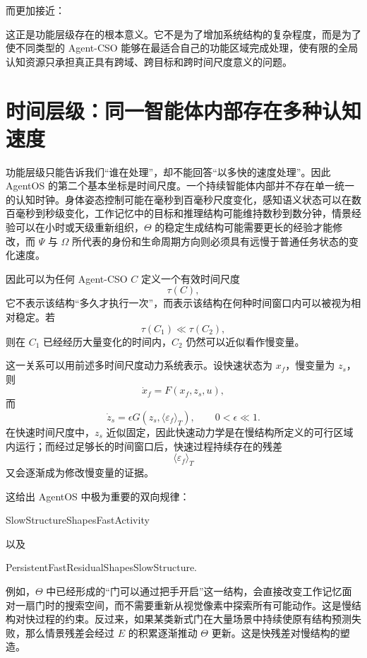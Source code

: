 而更加接近：

\begin{statementbox}
\centering
{}
\end{statementbox}

这正是功能层级存在的根本意义。它不是为了增加系统结构的复杂程度，而是为了使不同类型的 Agent-CSO 能够在最适合自己的功能区域完成处理，使有限的全局认知资源只承担真正具有跨域、跨目标和跨时间尺度意义的问题。


\section{时间层级：同一智能体内部存在多种认知速度}

功能层级只能告诉我们“谁在处理”，却不能回答“以多快的速度处理”。因此 AgentOS 的第二个基本坐标是时间尺度。一个持续智能体内部并不存在单一统一的认知时钟。身体姿态控制可能在毫秒到百毫秒尺度变化，感知语义状态可以在数百毫秒到秒级变化，工作记忆中的目标和推理结构可能维持数秒到数分钟，情景经验可以在小时或天级重新组织，$\Theta$ 的稳定生成结构可能需要更长的经验才能修改，而 $\Psi$ 与 $\Omega$ 所代表的身份和生命周期方向则必须具有远慢于普通任务状态的变化速度。

因此可以为任何 Agent-CSO $C$ 定义一个有效时间尺度
\[
\tau(C),
\]
它不表示该结构“多久才执行一次”，而表示该结构在何种时间窗口内可以被视为相对稳定。若
\[
\tau(C_1)\ll\tau(C_2),
\]
则在 $C_1$ 已经经历大量变化的时间内，$C_2$ 仍然可以近似看作慢变量。

这一关系可以用前述多时间尺度动力系统表示。设快速状态为 $x_f$，慢变量为 $z_s$，则
\[
\dot x_f
=
F(x_f,z_s,u),
\]
而
\[
\dot z_s
=
\epsilon G(z_s,\langle \varepsilon_f\rangle_T),
\qquad
0<\epsilon\ll1.
\]
在快速时间尺度中，$z_s$ 近似固定，因此快速动力学是在慢结构所定义的可行区域内运行；而经过足够长的时间窗口后，快速过程持续存在的残差
\[
\langle\varepsilon_f\rangle_T
\]
又会逐渐成为修改慢变量的证据。

这给出 AgentOS 中极为重要的双向规律：
\begin{statementbox}
SlowStructureShapesFastActivity
\end{statementbox}
以及
\begin{statementbox}
PersistentFastResidualShapesSlowStructure.
\end{statementbox}

例如，$\Theta$ 中已经形成的“门可以通过把手开启”这一结构，会直接改变工作记忆面对一扇门时的搜索空间，而不需要重新从视觉像素中探索所有可能动作。这是慢结构对快过程的约束。反过来，如果某类新式门在大量场景中持续使原有结构预测失败，那么情景残差会经过 $E$ 的积累逐渐推动 $\Theta$ 更新。这是快残差对慢结构的塑造。

